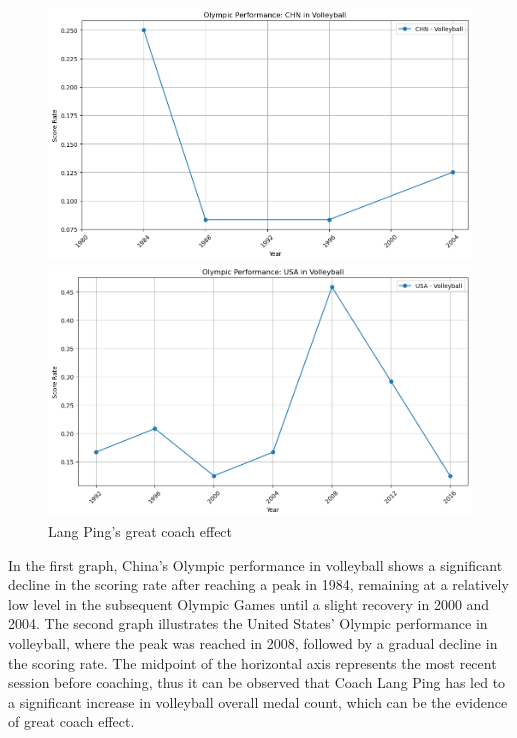 \documentclass[12pt]{article}
\begin{document}
\begin{figure}[h]
	\begin{minipage}[b]{0.5\textwidth}
		\centering
		\includegraphics[width=1\textwidth]{figure/langping_chn.png}
	\end{minipage}
	\begin{minipage}[b]{0.5\textwidth}
		\centering
		\includegraphics[width=1\textwidth]{figure/langping_usa.png}
	\end{minipage}
	\caption{Lang Ping's great coach effect}\label{fig3}
\end{figure}

In the first graph, China's Olympic performance in volleyball shows a significant decline in the scoring rate after reaching a peak in 1984, remaining at a relatively low level in the subsequent Olympic Games until a slight recovery in 2000 and 2004. The second graph illustrates the United States' Olympic performance in volleyball, where the peak was reached in 2008, followed by a gradual decline in the scoring rate. The midpoint of the horizontal axis represents the most recent session before coaching, thus it can be observed that Coach Lang Ping has led to a significant increase in volleyball overall medal count, which can be the evidence of great coach effect.\\
\end{document}
